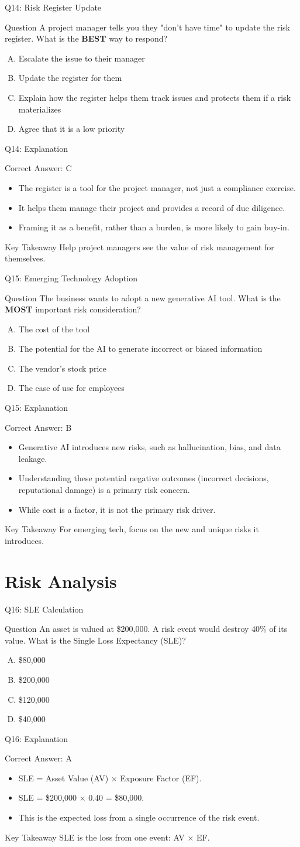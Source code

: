 \documentclass[aspectratio=169]{beamer}
\newcommand{\hq}[7]{%
	\begin{frame}{Q#1: #2}
		\begin{block}{Question}
			#3
		\end{block}
		\begin{enumerate}[(A)]
			#4
		\end{enumerate}
	\end{frame}
	\begin{frame}{Q#1: Explanation}
		\begin{block}{Correct Answer: #5}
			\begin{itemize}
				#6
			\end{itemize}
		\end{block}
		\begin{alertblock}{Key Takeaway}
			#7
		\end{alertblock}
	\end{frame}
}
\begin{document}
	\hq{14}{Risk Register Update}
	{A project manager tells you they "don't have time" to update the risk register. What is the \textbf{BEST} way to respond?}
	{\item Escalate the issue to their manager
		\item Update the register for them
		\item Explain how the register helps them track issues and protects them if a risk materializes
		\item Agree that it is a low priority}
	{C}
	{\item The register is a tool for the project manager, not just a compliance exercise.
		\item It helps them manage their project and provides a record of due diligence.
		\item Framing it as a benefit, rather than a burden, is more likely to gain buy-in.}
	{Help project managers see the value of risk management for themselves.}
	
	\hq{15}{Emerging Technology Adoption}
	{The business wants to adopt a new generative AI tool. What is the \textbf{MOST} important risk consideration?}
	{\item The cost of the tool
		\item The potential for the AI to generate incorrect or biased information
		\item The vendor's stock price
		\item The ease of use for employees}
	{B}
	{\item Generative AI introduces new risks, such as hallucination, bias, and data leakage.
		\item Understanding these potential negative outcomes (incorrect decisions, reputational damage) is a primary risk concern.
		\item While cost is a factor, it is not the primary risk driver.}
	{For emerging tech, focus on the new and unique risks it introduces.}
	
	\section{Risk Analysis}
	
	\hq{16}{SLE Calculation}
	{An asset is valued at \$200,000. A risk event would destroy 40\% of its value. What is the Single Loss Expectancy (SLE)?}
	{\item \$80,000
		\item \$200,000
		\item \$120,000
		\item \$40,000}
	{A}
	{\item SLE = Asset Value (AV) × Exposure Factor (EF).
		\item SLE = \$200,000 × 0.40 = \$80,000.
		\item This is the expected loss from a single occurrence of the risk event.}
	{SLE is the loss from one event: AV × EF.}
	
\end{document}
